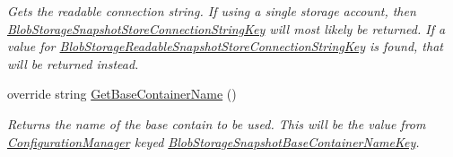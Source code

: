 \begin{DoxyCompactItemize}
\begin{DoxyCompactList}\small\item\em Gets the readable connection string. If using a single storage account, then \hyperlink{classCqrs_1_1Azure_1_1BlobStorage_1_1Events_1_1BlobStorageSnapshotStoreConnectionStringFactory_a9638ce6d0077def1e742b688e4581874_a9638ce6d0077def1e742b688e4581874}{Blob\+Storage\+Snapshot\+Store\+Connection\+String\+Key} will most likely be returned. If a value for \hyperlink{classCqrs_1_1Azure_1_1BlobStorage_1_1Events_1_1BlobStorageSnapshotStoreConnectionStringFactory_af194b50ec2e3de65c0207776491777d3_af194b50ec2e3de65c0207776491777d3}{Blob\+Storage\+Readable\+Snapshot\+Store\+Connection\+String\+Key} is found, that will be returned instead. \end{DoxyCompactList}\item 
override string \hyperlink{classCqrs_1_1Azure_1_1BlobStorage_1_1Events_1_1BlobStorageSnapshotStoreConnectionStringFactory_a0b73f62d5148d477fe76d78f4171dac6_a0b73f62d5148d477fe76d78f4171dac6}{Get\+Base\+Container\+Name} ()
\begin{DoxyCompactList}\small\item\em Returns the name of the base contain to be used. This will be the value from \hyperlink{namespaceCqrs_1_1Azure_1_1ConfigurationManager}{Configuration\+Manager} keyed \hyperlink{classCqrs_1_1Azure_1_1BlobStorage_1_1Events_1_1BlobStorageSnapshotStoreConnectionStringFactory_a9777a326f415cc28d4b14133da4347da_a9777a326f415cc28d4b14133da4347da}{Blob\+Storage\+Snapshot\+Base\+Container\+Name\+Key}. \end{DoxyCompactList}\end{DoxyCompactItemize}
